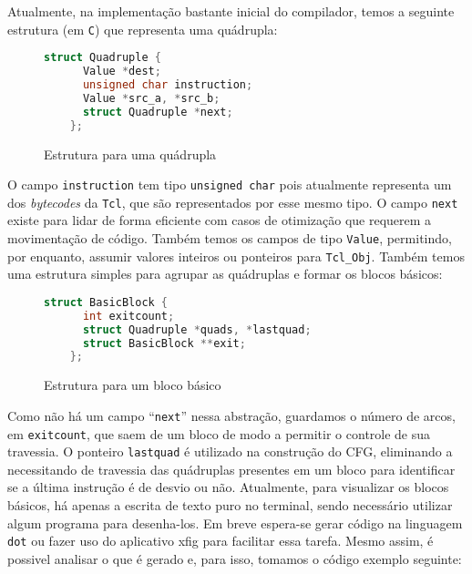 Atualmente, na implementação bastante inicial do compilador, temos a
seguinte estrutura (em \texttt{C}) que representa uma quádrupla:

\begin{figure}[h]
  \centering
  \begin{lstlisting}[language=C]
    struct Quadruple {
      Value *dest;
      unsigned char instruction;
      Value *src_a, *src_b;
      struct Quadruple *next;
    };
  \end{lstlisting}
  \caption{Estrutura para uma quádrupla}
\end{figure}

O campo \verb!instruction! tem tipo \verb!unsigned char! pois atualmente
representa um dos \textit{bytecodes} da \texttt{Tcl}, que são
representados por esse mesmo tipo. O campo \verb!next! existe para
lidar de forma eficiente com casos de otimização que requerem a
movimentação de código. Também temos os campos de tipo \verb!Value!,
permitindo, por enquanto, assumir valores inteiros ou ponteiros para
\verb!Tcl_Obj!. %
Também temos uma estrutura simples para agrupar as quádruplas e formar
os blocos básicos:

\begin{figure}[h]
  \centering
  \begin{lstlisting}[language=C]
    struct BasicBlock {
      int exitcount;
      struct Quadruple *quads, *lastquad;
      struct BasicBlock **exit;
    };
  \end{lstlisting}
  \caption{Estrutura para um bloco básico}
\end{figure}

Como não há um campo ``\verb!next!'' nessa abstração, guardamos o
número de arcos, em \verb!exitcount!, que saem de um bloco de modo a
permitir o controle de sua travessia. O ponteiro \verb!lastquad! é
utilizado na construção do CFG, eliminando a necessitando de travessia das
quádruplas presentes em um bloco para identificar se a última
instrução é de desvio ou não. Atualmente, para visualizar os blocos básicos,
há apenas a escrita de texto puro no terminal, sendo
necessário utilizar algum programa para desenha-los. Em breve
espera-se gerar código na linguagem \texttt{dot} ou fazer uso do
aplicativo xfig para facilitar essa tarefa. Mesmo assim, é possivel
analisar o que é gerado e, para isso, tomamos o código exemplo seguinte:

